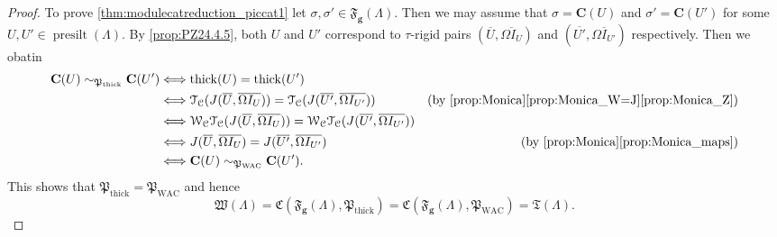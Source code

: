 \documentclass[10pt,twoside, a4paper,reqno]{amsart}
\DeclareMathOperator{\presilt}{presilt}
\DeclareMathOperator{\thick}{thick}
\newcommand{\partfan}[1]{\mathfrak{F}_{\bfg}(#1)}
\newcommand{\catof}{\mathfrak{C}}
\newcommand{\Wfrak}{\mathfrak{W}}
\newcommand{\Pfrak}{\mathfrak{P}}
\newcommand{\calC}{\mathcal{C}}
\newcommand{\calT}{\mathcal{T}}
\newcommand{\calW}{\mathcal{W}}
\newcommand{\boldC}{\mathbf{C}}
\newcommand{\bfg}{\mathbf{g}}
\theoremstyle{definition}
\begin{document}
\begin{proof}
	To prove \eqref{thm:modulecatreduction_piccat1} {l}et $\sigma, \sigma' \in \partfan{\Lambda}$. Then we may assume that $\sigma = \boldC(U)$ and $\sigma' = \boldC(U')$ for some $U,U' \in \presilt(\Lambda)$. By \eqref{prop:PZ24.4.5}, both $U$ and $U'$ correspond to $\tau$-rigid pairs $(\overline{U}, \overline{\Omega I_U})$ and $(\overline{U'}, \overline{\Omega I_{U'}})$ respectively. Then we obatin
    \begin{align*}
        \boldC(U) \sim_{\Pfrak_{\thick}} \boldC(U') & \Longleftrightarrow \thick(U) = \thick(U') \\
        & \Longleftrightarrow \calT_{\calC} (J(\overline{U}, \overline{\Omega I_U})) = \calT_{\calC}( J(\overline{U'}, \overline{\Omega I_{U'}})) &\text{(by \cref{prop:Monica}\eqref{prop:Monica_W=J}\eqref{prop:Monica_Z})} \\
        & \Longleftrightarrow \calW_{\calC}\calT_{\calC} (J(\overline{U}, \overline{\Omega I_U})) = \calW_{\calC} \calT_{\calC}( J(\overline{U'}, \overline{\Omega I_{U'}})) \\
        & \Longleftrightarrow J(\overline{U}, \overline{\Omega I_U}) =  J(\overline{U'}, \overline{\Omega I_{U'}}) & \text{(by \cref{prop:Monica}\eqref{prop:Monica_maps})} \\
        & \Longleftrightarrow \boldC(U) \sim_{\Pfrak_{\mathrm{WAC}}} \boldC(U').
    \end{align*}
    This shows that $\Pfrak_{\thick} = \Pfrak_{\mathrm{WAC}}$ and hence 
    \[\Wfrak(\Lambda) = \catof(\partfan{\Lambda}, \Pfrak_{\thick}) = \catof(\partfan{\Lambda}, \Pfrak_{\mathrm{WAC}}) = \mathfrak{T}(\Lambda).\]
    

\end{proof}
\end{document}
